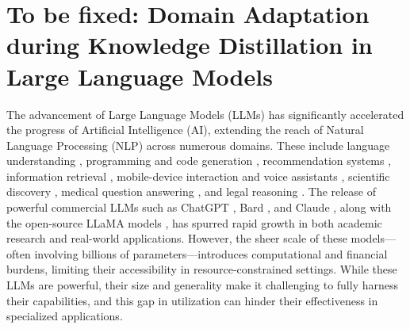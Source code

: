 \section{ To be fixed: Domain Adaptation during Knowledge Distillation in Large Language Models}

The advancement of Large Language Models (LLMs) has significantly accelerated the progress of Artificial Intelligence (AI), extending the reach of Natural Language Processing (NLP) across numerous domains. 
These include language understanding \cite{brown2020language}, programming and code generation \cite{chen2021evaluating}, recommendation systems \cite{sun2023recommendation}, information retrieval \cite{ma2023instructretrieval}, mobile-device interaction and voice assistants \cite{rao2023speak}, scientific discovery \cite{nori2023capabilities}, medical question answering \cite{singhal2022large}, and legal reasoning \cite{katz2023gpt}. 
The release of powerful commercial LLMs such as ChatGPT \cite{openai2023gpt4}, Bard \cite{thoppilan2022lamda}, and Claude \cite{anthropic2023claude}, along with the open-source LLaMA models \cite{touvron2023llama, touvron2023llama2}, has spurred rapid growth in both academic research and real-world applications. 
However, the sheer scale of these models—often involving billions of parameters—introduces computational and financial burdens, limiting their accessibility in resource-constrained settings. 
While these LLMs are powerful, their size and generality make it challenging to fully harness their capabilities, and this gap in utilization can hinder their effectiveness in specialized applications.

